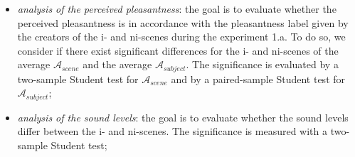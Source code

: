 \documentclass[12pt]{elsarticle}
\newcommand{\ie}{\emph{i.\,e.}}
\begin{document}
\begin{itemize}


\item \emph{analysis of the perceived pleasantness}: the goal is to evaluate whether the perceived pleasantness is in accordance with the pleasantness label given by the creators of the  i- and ni-scenes during the experiment 1.a. To do so, we consider if there exist significant differences for the i- and ni-scenes of the average $\mathcal{A}_{scene}$ and the average $\mathcal{A}_{subject}$. The significance is evaluated by a two-sample Student test for $\mathcal{A}_{scene}$ and by a paired-sample Student test for $\mathcal{A}_{subject}$;



\item \emph{analysis of the sound levels}: the goal is to evaluate whether the sound levels differ between the i- and ni-scenes. The significance is measured with a two-sample Student test;



\end{itemize}
\end{document}
